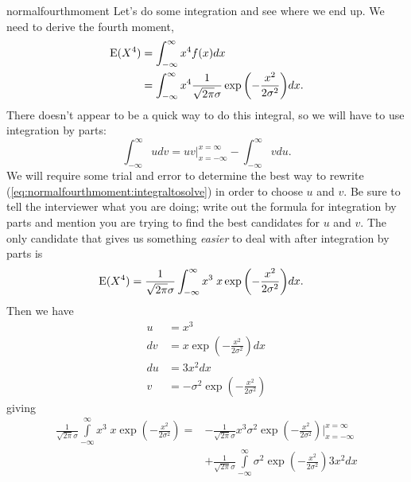 \begin{answer}{normalfourthmoment}
Let's do some integration and see where we end up.
We need to derive the fourth moment,
\begin{align}
\operatorname{\mathrm{E}}(X^4)
&= \int_{-\infty}^{\infty}{
          x^4
          f(x)
          dx} \nonumber \\
&= \int_{-\infty}^{\infty}{
          x^4
          \frac{1}{\sqrt{2 \pi} \sigma }
          \exp{\left( -\frac{x^2}{2\sigma^2}  \right)}
          dx}
\label{eq:normalfourthmoment:integraltosolve}
\text{.}
\end{align}
There doesn't appear to be a quick way to do this integral, so we will have to use integration by parts:
\[
\int_{-\infty}^{\infty}{ u dv }
=
uv\Big\vert_{x=-\infty}^{x=\infty} - \int_{-\infty}^{\infty}{ v du }
\text{.}
\]
We will require some trial and error to determine the best way to rewrite
(\ref{eq:normalfourthmoment:integraltosolve}) in order to choose $u$ and $v$.
Be sure to tell the interviewer what you are doing; write out the formula for integration by parts and mention you are trying to find the best candidates for $u$ and $v$.
The only candidate that gives us something \emph{easier} to deal with after integration by parts is
\begin{align*}
\operatorname{\mathrm{E}}(X^4)
&=
          \frac{1}{\sqrt{2 \pi} \sigma }
          \int_{-\infty}^{\infty}{
          x^3
          \;
          x
          \exp{\left( -\frac{x^2}{2\sigma^2}  \right)}
          dx}
\text{.}
\end{align*}
Then we have
\begin{align*}
u   &= x^3      \\
dv  &=
        x
        \exp{\left( -\frac{x^2 }{2\sigma^2} \right)}
        dx
        \\
%
du  &= 3 x^2 dx \\
v   &=
       - \sigma^2
        \exp{\left( -\frac{x^2}{2\sigma^2}  \right)}
\end{align*}
giving
\begin{equation}
\begin{aligned}
\label{eq:fourthmoment:nearlythere}
\frac{1}{\sqrt{2 \pi} \sigma }
\int\limits_{-\infty}^{\infty}{
  x^3
  \;
  x \exp{\left( -\frac{x^2}{2\sigma^2}  \right)}
}
=
&-\frac{1}{\sqrt{2 \pi} \sigma }
x^3
\sigma^2
\exp{\left( -\frac{x^2}{2\sigma^2}  \right)} \bigg|_{x=-\infty}^{x=\infty}
\\
&+
\frac{1}{\sqrt{2 \pi} \sigma }
\int\limits_{-\infty}^{\infty}{
  \sigma^2
  \exp{\left( -\frac{x^2}{2\sigma^2}   \right)}
 3 x^2
  dx
}
\end{aligned}
\end{equation}
\end{answer}
